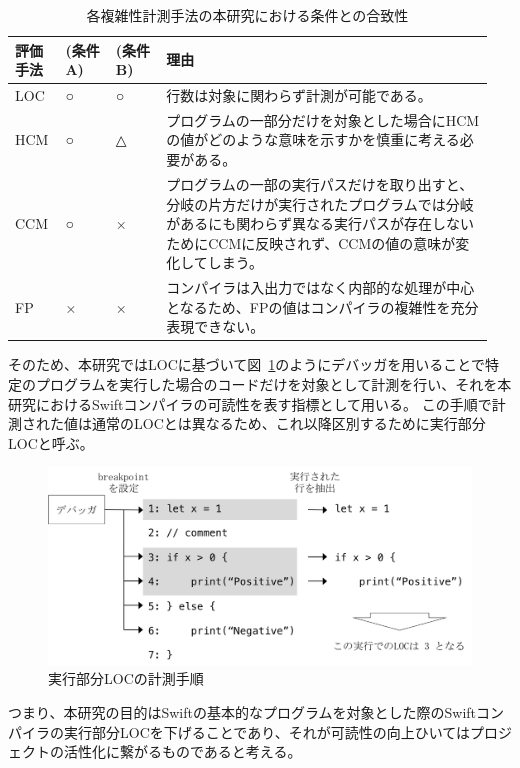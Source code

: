\begin{table}[!hbtp]
    \begin{center}
        \caption{各複雑性計測手法の本研究における条件との合致性}
        \begin{tabular}{|p{0.1\linewidth}|p{0.1\linewidth}|p{0.1\linewidth}|p{0.65\linewidth}|}
            \hline
            評価手法 & (条件A) & (条件B) & 理由\\
            \hline
            \hline
            LOC & ○ & ○ & 行数は対象に関わらず計測が可能である。\\
            \hline
            HCM & ○ & △ & プログラムの一部分だけを対象とした場合にHCMの値がどのような意味を示すかを慎重に考える必要がある。\\
            \hline
            CCM & ○ & × & プログラムの一部の実行パスだけを取り出すと、分岐の片方だけが実行されたプログラムでは分岐があるにも関わらず異なる実行パスが存在しないためにCCMに反映されず、CCMの値の意味が変化してしまう。\\
            \hline
            FP & × & × & コンパイラは入出力ではなく内部的な処理が中心となるため、FPの値はコンパイラの複雑性を充分表現できない。 \\
            \hline
        \end{tabular}
        \label{table:evaluation-property}
    \end{center}
\end{table}

そのため、本研究ではLOCに基づいて図~\ref{img:loc-measurement}のようにデバッガを用いることで特定のプログラムを実行した場合のコードだけを対象として計測を行い、それを本研究におけるSwiftコンパイラの可読性を表す指標として用いる。
この手順で計測された値は通常のLOCとは異なるため、これ以降区別するために実行部分LOCと呼ぶ。

\begin{figure}
    \begin{center}
        \includegraphics[scale=0.8]{./img/loc_measurement.png}
        \caption{実行部分LOCの計測手順}
        \label{img:loc-measurement}
    \end{center}
\end{figure}

つまり、本研究の目的はSwiftの基本的なプログラムを対象とした際のSwiftコンパイラの実行部分LOCを下げることであり、それが可読性の向上ひいてはプロジェクトの活性化に繋がるものであると考える。
